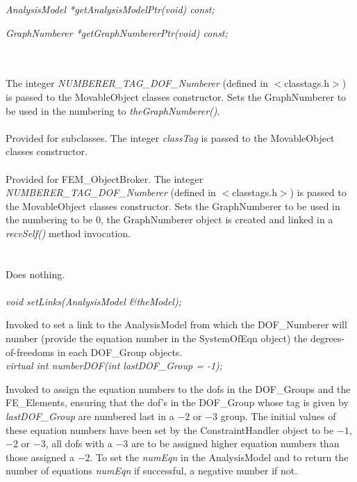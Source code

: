 {\em AnalysisModel *getAnalysisModelPtr(void) const;} 

{\em GraphNumberer *getGraphNumbererPtr(void) const;} 



 \\
\\ 
The integer {\em NUMBERER\_TAG\_DOF\_Numberer}
(defined in $<$classtags.h$>$) is passed to the MovableObject classes
constructor. Sets the GraphNumberer to be used in the numbering to {\em
theGraphNumberer()}. \\

\\ 
Provided for subclasses. The integer {\em classTag} is passed to the
MovableObject classes constructor. \\


\\ 
Provided for FEM\_ObjectBroker. The integer {\em NUMBERER\_TAG\_DOF\_Numberer}
(defined in $<$classtags.h$>$) is passed to the MovableObject classes
constructor. Sets the GraphNumberer to be used in the numbering to be
$0$, the GraphNumberer object is created and linked in a {\em
recvSelf()} method invocation. \\


 \\
\\ 
Does nothing. \\

\\
{\em void setLinks(AnalysisModel \&theModel);} 

Invoked to set a link to the AnalysisModel from which the
DOF\_Numberer will number (provide the equation number in the
SystemOfEqn object) the degrees-of-freedoms in each DOF\_Group
objects.\\  

{\em virtual int numberDOF(int lastDOF\_Group = -1);} 

Invoked to assign the equation numbers to the dofs in the DOF\_Groups
and the FE\_Elements, ensuring that the dof's in the DOF\_Group whose
tag is given by {\em lastDOF\_Group} are numbered last in a $-2$ or
$-3$ group. The initial values of these equation numbers have been set
by the ConstraintHandler object to be $-1$, $-2$ or $-3$, all dofs
with a $-3$ are to be assigned higher equation numbers than those
assigned a $-2$. To set the {\em numEqn} in the AnalysisModel and to
return the number of equations {\em numEqn} if successful, a negative
number if not.  

